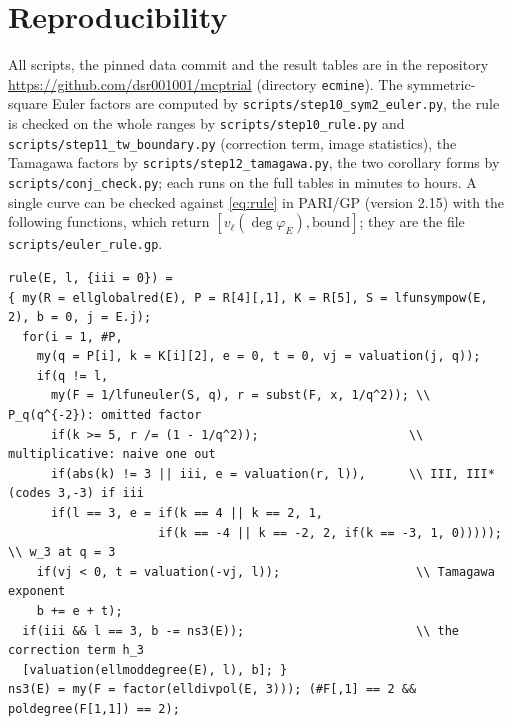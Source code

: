 \documentclass[11pt]{amsart}
\theoremstyle{definition}
\newcommand{\degphi}{\deg\varphi_E}
\begin{document}
\appendix
\section{Reproducibility}
All scripts, the pinned data commit and the result tables are in the repository \url{https://github.com/dsr001001/mcptrial} (directory \texttt{ecmine}). The symmetric-square Euler factors are computed by \texttt{scripts/step10\_sym2\_euler.py}, the rule is checked on the whole ranges by \texttt{scripts/step10\_rule.py} and \texttt{scripts/step11\_tw\_boundary.py} (correction term, image statistics), the Tamagawa factors by \texttt{scripts/step12\_tamagawa.py}, the two corollary forms by \texttt{scripts/conj\_check.py}; each runs on the full tables in minutes to hours. A single curve can be checked against \eqref{eq:rule} in PARI/GP (version 2.15) with the following functions, which return $[v_\ell(\degphi),\text{bound}]$; they are the file \texttt{scripts/euler\_rule.gp}.
{\footnotesize\begin{verbatim}
rule(E, l, {iii = 0}) =
{ my(R = ellglobalred(E), P = R[4][,1], K = R[5], S = lfunsympow(E, 2), b = 0, j = E.j);
  for(i = 1, #P,
    my(q = P[i], k = K[i][2], e = 0, t = 0, vj = valuation(j, q));
    if(q != l,
      my(F = 1/lfuneuler(S, q), r = subst(F, x, 1/q^2)); \\ P_q(q^{-2}): omitted factor
      if(k >= 5, r /= (1 - 1/q^2));                     \\ multiplicative: naive one out
      if(abs(k) != 3 || iii, e = valuation(r, l)),      \\ III, III* (codes 3,-3) if iii
      if(l == 3, e = if(k == 4 || k == 2, 1,
                     if(k == -4 || k == -2, 2, if(k == -3, 1, 0)))));   \\ w_3 at q = 3
    if(vj < 0, t = valuation(-vj, l));                   \\ Tamagawa exponent
    b += e + t);
  if(iii && l == 3, b -= ns3(E));                        \\ the correction term h_3
  [valuation(ellmoddegree(E), l), b]; }
ns3(E) = my(F = factor(elldivpol(E, 3))); (#F[,1] == 2 && poldegree(F[1,1]) == 2);
\end{verbatim}}
\end{document}
